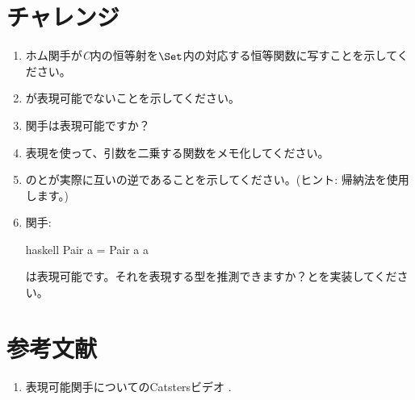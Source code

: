 \section{チャレンジ}

\begin{enumerate}
  \tightlist
  \item
        ホム関手が\emph{C}内の恒等射を$\Set$内の対応する恒等関数に写すことを示してください。
  \item
        が表現可能でないことを示してください。
  \item
        関手は表現可能ですか？
  \item
        表現を使って、引数を二乗する関数をメモ化してください。
  \item
        のとが実際に互いの逆であることを示してください。(ヒント: 帰納法を使用します。) 
  \item
        関手: 

        \begin{snip}{haskell}
Pair a = Pair a a
\end{snip}
        は表現可能です。それを表現する型を推測できますか？とを実装してください。
\end{enumerate}

\section{参考文献}

\begin{enumerate}
  \tightlist
  \item
        表現可能関手についてのCatstersビデオ
        .
\end{enumerate}
